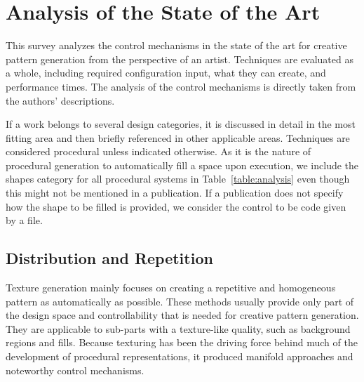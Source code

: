 

\section{Analysis of the State of the Art}
\label{sec:analysis}

This survey analyzes the control mechanisms in the state of the art for creative pattern generation from the perspective of an artist. Techniques are evaluated as a whole, including required configuration input, what they can create, and performance times. The analysis of the control mechanisms is directly taken from the authors' descriptions. 


If a work belongs to several design categories, it is discussed in detail in the most fitting area and then briefly referenced in other applicable areas. Techniques are considered procedural unless indicated otherwise. As it is the nature of procedural generation to automatically fill a space upon execution, we include the shapes category for all procedural systems in Table~\ref{table:analysis} even though this might not be mentioned in a publication. 
If a publication does not specify how the shape to be filled is provided, we consider the control to be code given by a file.

\subsection{Distribution and Repetition}
\label{subsec:analysis_distribution_and_repetition}

 Texture generation mainly focuses on creating a repetitive and homogeneous pattern as automatically as possible. These methods usually provide only part of the design space and controllability that is needed for creative pattern generation. They are applicable to sub-parts with a texture-like quality, such as background regions and fills. Because texturing has been the driving force behind much of the development of procedural representations, it produced manifold approaches and noteworthy control mechanisms. 

